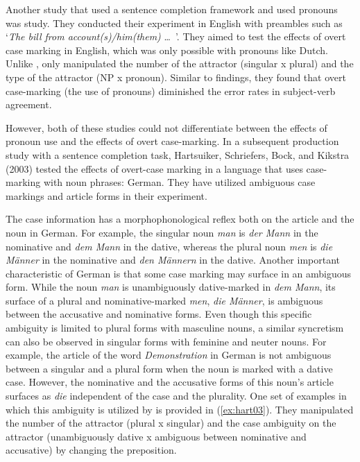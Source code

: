 Another study that used a sentence completion framework and used pronouns was \cites{NicolAnton2009} study. They conducted their experiment in English with preambles such as `\emph{The {bill} from account(s)/him(them)} \ldots{\ }'. They aimed to test the effects of overt case marking in English, which was only possible with pronouns like Dutch. Unlike ,  only manipulated the number of the attractor (singular x plural) and the type of the attractor (NP x pronoun). Similar to \cites{HatsuikerEtAl2001} findings, they found that overt case-marking (the use of pronouns) diminished the error rates in subject-verb agreement. 

However, both of these studies could not differentiate between the effects of pronoun use and the effects of overt case-marking. In a subsequent production study with a sentence completion task, Hartsuiker, Schriefers, Bock, and Kikstra (2003) tested the effects of overt-case marking in a language that uses case-marking with noun phrases: German. They have utilized ambiguous case markings and article forms in their experiment. 

The case information has a morphophonological reflex both on the article and the noun in German. For example, the singular noun \emph{man} is \emph{der Mann} in the nominative and \emph{dem Mann} in the dative, whereas the plural noun \emph{men} is \emph{die M\"anner} in the nominative and \emph{den M\"annern} in the dative. Another important characteristic of German is that some case marking may surface in an ambiguous form. While the noun \emph{man} is unambiguously dative-marked in \emph{dem Mann}, its surface of a plural and nominative-marked \emph{men}, \emph{die M\"anner}, is ambiguous between the accusative and nominative forms. Even though this specific ambiguity is limited to plural forms with masculine nouns, a similar syncretism can also be observed in singular forms with feminine and neuter nouns. For example, the article of the word \emph{Demonstration} in German is not ambiguous between a singular and a plural form when the noun is marked with a dative case. However, the nominative and the accusative forms of this noun's article surfaces as \emph{die} independent of the case and the plurality. One set of examples in which this ambiguity is utilized by  is provided in (\ref{ex:hart03}). They manipulated the number of the attractor (plural x singular) and the case ambiguity on the attractor (unambiguously dative x ambiguous between nominative and accusative) by changing the preposition. 

